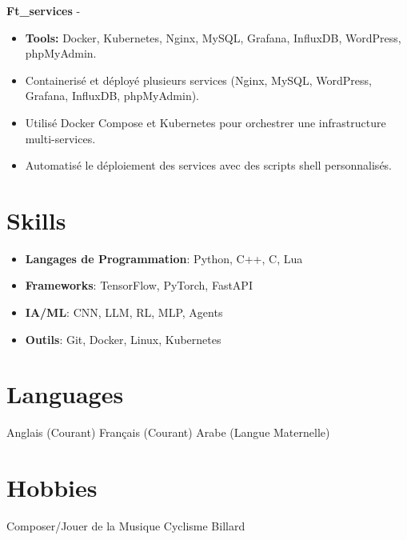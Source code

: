 \documentclass[a4paper,11pt]{article}%
\begin{document}
%
\noindent \textbf{Ft\_services} - \href{https://github.com/sboof911/ft_services}{{}}%
\begin{itemize}[leftmargin=2em,parsep=0pt,topsep=1em]%
\item[] \textbf{Tools:} Docker, Kubernetes, Nginx, MySQL, Grafana, InfluxDB, WordPress, phpMyAdmin.%
\item Containeris\'e et d\'eploy\'e plusieurs services (Nginx, MySQL, WordPress, Grafana, InfluxDB, phpMyAdmin).%
\item Utilis\'e Docker Compose et Kubernetes pour orchestrer une infrastructure multi-services.%
\item Automatis\'e le d\'eploiement des services avec des scripts shell personnalis\'es.%
\end{itemize}%
\section*{Skills}%
\begin{itemize}[leftmargin=*]%
\item \textbf{Langages de Programmation}: Python, C++, C, Lua%
\item \textbf{Frameworks}: TensorFlow, PyTorch, FastAPI%
\item \textbf{IA/ML}: CNN, LLM, RL, MLP, Agents%
\item \textbf{Outils}: Git, Docker, Linux, Kubernetes%
\end{itemize}%
\section*{Languages}%
Anglais (Courant)%
\newline%
%
Fran\c{c}ais (Courant)%
\newline%
%
Arabe (Langue Maternelle)%
\newline%
%
\section*{Hobbies}%
Composer/Jouer de la Musique%
\newline%
%
Cyclisme%
\newline%
%
Billard%
\newline%
%
\end{document}
